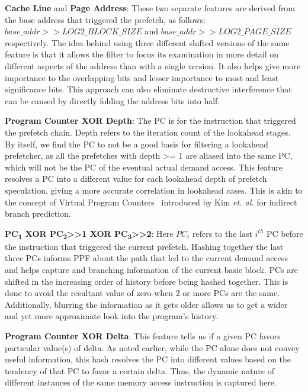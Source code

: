 \noindent \textbf{Cache Line} and \textbf{Page Address}: These two
separate features are derived from the base address that triggered the
prefetch, as follows: $base\_addr >> LOG2\_BLOCK \_SIZE$ and
$base\_addr >> LOG2\_PAGE\_SIZE$ respectively. The idea behind using
three different shifted versions of the same feature is that it allows
the filter to focus its examination in more detail on different
aspects of the address than with a single version.  It also helps give
more importance to the overlapping bits and lesser importance to most
and least significance bits.  This approach can also eliminate
destructive interference that can be caused by directly folding
the address bits into half.

\noindent \textbf{Program Counter XOR Depth}: The PC is for the
instruction that triggered the prefetch chain.  Depth refers to the
iteration count of the lookahead stages.  By itself, we find the PC to
not be a good basis for filtering a lookahead prefetcher, as all the
prefetches with depth >= 1 are aliased into the same PC, which will
not be the PC of the eventual actual demand access.  This feature
resolves a PC into a different value for each lookahead depth of
prefetch speculation, giving a more accurate correlation in lookahead
cases.  This is akin to the concept of Virtual Program
Counters~\cite{VPC} introduced by Kim \textit{et. al.} for indirect
branch prediction.

\noindent \textbf{PC\textsubscript{1} XOR PC\textsubscript{2}>>1 XOR
  PC\textsubscript{3}>>2}: Here $PC_i$ refers to the last $i^{th}$ PC
before the instruction that triggered the current prefetch.  Hashing
together the last three PCs informs PPF about the path that led to the
current demand access and helps capture and branching information of
the current basic block.  PCs are shifted in the increasing order of
history before being hashed together. This is done to avoid the
resultant value of zero when 2 or more PCs are the same. Additionally,
blurring the information as it gets older allows us to get a wider and
yet more approximate look into the program's history.

\noindent \textbf{Program Counter XOR Delta}: This feature tells us if
a given PC favors particular value(s) of delta.  As noted earlier,
while the PC alone does not convey useful information, this hash
resolves the PC into different values based on the tendency of that PC
to favor a certain delta.  Thus, the dynamic nature of different
instances of the same memory access instruction is captured here.

